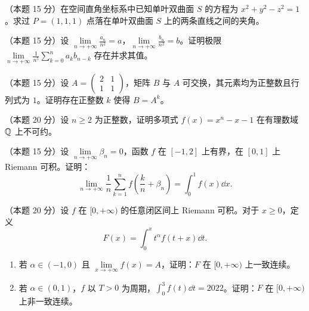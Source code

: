 
\begin{problems}

\item[一、]（本题 15 分）在空间直角坐标系中已知单叶双曲面 $S$ 的方程为 $x^2+y^2-z^2=1$。求过 $P=(1,1,1)$ 点落在单叶双曲面 $S$ 上的两条直线之间的夹角。

\item[二、]（本题 15 分）设 $\lim\limits_{n\to+\infty}\frac{a_n}{n^2}=a$，$\lim\limits_{n\to+\infty}\frac{b_n}{n^2}=b$。证明极限
$\lim\limits_{n\to+\infty}\frac{1}{n^5}\sum\limits_{k=0}^{n}a_kb_{n-k}$
存在并求其值。

\item[三、]（本题 15 分）设 $A=\begin{pmatrix}2&1\\1&1\end{pmatrix}$，矩阵 $B$ 与 $A$ 可交换，其元素均为正整数且行列式为 $1$。证明存在正整数 $k$ 使得 $B=A^k$。

\item[四、]（本题 20 分）设 $n\ge2$ 为正整数，证明多项式 $f(x)=x^n-x-1$ 在有理数域 $\mathbb{Q}$ 上不可约。

\item[五、]（本题 15 分）设 $\lim\limits_{n\to+\infty}\beta_n=0$，函数 $f$ 在 $[-1,2]$ 上有界，在 $[0,1]$ 上 Riemann 可积。证明：
\[
\lim_{n\to+\infty}\frac{1}{n}\sum_{k=1}^{n}f\left(\frac{k}{n}+\beta_n\right)=\int_0^1f(x)\dd x.
\]

\item[六、]（本题 20 分）设 $f$ 在 $[0,+\infty)$ 的任意闭区间上 Riemann 可积。对于 $x\ge0$，定义
\[
F(x)=\int_0^xt^\alpha f(t+x)\dd t.
\]
\begin{enumerate}
  \item 若 $\alpha\in(-1,0)$ 且 $\lim\limits_{x\to+\infty}f(x)=A$，证明：$F$ 在 $[0,+\infty)$ 上一致连续。
  \item 若 $\alpha\in(0,1)$，$f$ 以 $T>0$ 为周期，$\int_0^3f(t)\dd t=2022$。证明：$F$ 在 $[0,+\infty)$ 上非一致连续。
\end{enumerate}

\end{problems}
